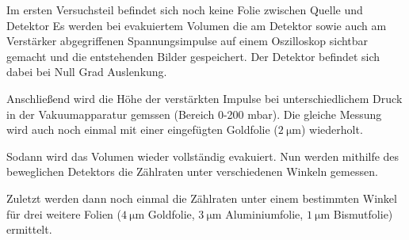 Im ersten Versuchsteil befindet sich noch keine Folie zwischen Quelle und Detektor
Es werden bei evakuiertem Volumen die am Detektor sowie auch am Verstärker
abgegriffenen  Spannungsimpulse auf einem Oszilloskop sichtbar gemacht und die
entstehenden Bilder gespeichert. Der Detektor befindet sich dabei bei Null Grad Auslenkung.

Anschließend wird die Höhe der verstärkten Impulse bei unterschiedlichem Druck
in der Vakuumapparatur gemssen (Bereich 0-200 mbar). Die gleiche Messung wird auch
noch einmal mit einer eingefügten Goldfolie ($\SI{2}{\micro\meter}$) wiederholt.

Sodann wird das Volumen wieder vollständig evakuiert. Nun werden
mithilfe des beweglichen Detektors die Zählraten unter verschiedenen Winkeln gemessen.

Zuletzt werden dann noch einmal die Zählraten unter einem bestimmten Winkel für
drei weitere Folien ($\SI{4}{\micro\meter}$ Goldfolie, $\SI{3}{\micro\meter}$ Aluminiumfolie,
$\SI{1}{\micro\meter}$ Bismutfolie) ermittelt.
